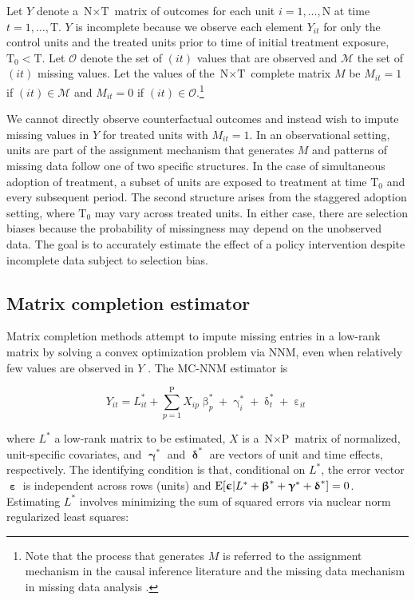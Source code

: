 Let $Y$ denote a $\text{N} \times \text{T}$ matrix of outcomes for each unit $i =1, \ldots, \text{N}$ at time $t = 1, \ldots, \text{T}$. $Y$ is incomplete because we observe each element $Y_{it}$ for only the control units and the treated units prior to time of initial treatment exposure, $\text{T}_0 < \text{T}$. Let $\mathcal{O}$ denote the set of $(it)$ values that are observed and $\mathcal{M}$ the set of $(it)$ missing values. Let the values of the $\text{N} \times \text{T}$ complete matrix $M$ be $M_{it} =1 $ if $(it) \in \mathcal{M}$ and $M_{it} = 0$ if $(it) \in \mathcal{O}$.\footnote{Note that the process that generates $M$ is referred to the assignment mechanism in the causal inference literature \citep{imbens2015causal} and the missing data mechanism in missing data analysis \citep{little2014}.}

We cannot directly observe counterfactual outcomes and instead wish to impute missing values in $Y$ for treated units with $M_{it}=1$. In an observational setting, units are part of the assignment mechanism that generates $M$ and patterns of missing data follow one of two specific structures. In the case of simultaneous adoption of treatment, a subset of units are exposed to treatment at time $\text{T}_0$ and every subsequent period. The second structure arises from the staggered adoption setting, where $\text{T}_0$ may vary across treated units. In either case, there are selection biases because the probability of missingness may depend on the unobserved data. The goal is to accurately estimate the effect of a policy intervention despite incomplete data subject to selection bias. 

\subsection{Matrix completion estimator}

Matrix completion methods attempt to impute missing entries in a low-rank matrix by solving a convex optimization problem via NNM, even when relatively few values are observed in $Y$ \citep{candes2009exact,candes2010matrix}. The MC-NNM estimator is 

\begin{equation}
Y_{it} = L_{it}^{*} + \sum_{p=1}^{\text{P}} X_{ip} \upbeta_{p}^{*} + \upgamma_{i}^{*} + \updelta_{t}^{*} + \upepsilon_{it} \label{eq:mc-Y}
\end{equation}

\noindent
where $L^{*}$ a low-rank matrix to be estimated, $X$ is a $\text{N} \times \text{P}$ matrix of normalized, unit-specific covariates, and $\boldsymbol{\upgamma}^{*}$ and $\boldsymbol{\updelta}^{*}$ are vectors of unit and time effects, respectively. The identifying condition is that, conditional on $L^{*}$, the error vector $\boldsymbol{\upepsilon}$ is independent across rows (units) and $\mathrm{E}[\boldsymbol{\upepsilon} | L^{*} + \boldsymbol{\upbeta}^{*} + \boldsymbol{\upgamma}^{*} + \boldsymbol{\updelta}^{*}] = 0$. Estimating $L^{*}$ involves minimizing the sum of squared errors via nuclear norm regularized least squares:

